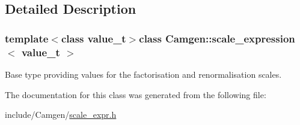\subsection{Detailed Description}
\subsubsection*{template$<$class value\+\_\+t$>$class Camgen\+::scale\+\_\+expression$<$ value\+\_\+t $>$}

Base type providing values for the factorisation and renormalisation scales. 



The documentation for this class was generated from the following file\+:\begin{DoxyCompactItemize}
\item 
include/\+Camgen/\hyperlink{a00766}{scale\+\_\+expr.\+h}\end{DoxyCompactItemize}
